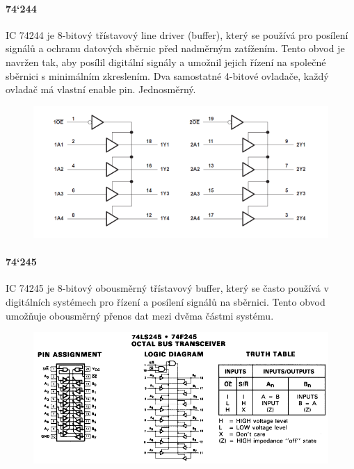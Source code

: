 \paragraph{74`244}
IC 74244 je 8-bitový třístavový line driver (buffer), který se používá pro posílení signálů a ochranu datových sběrnic před nadměrným zatížením. Tento obvod je navržen tak, aby posílil digitální signály a umožnil jejich řízení na společné sběrnici s minimálním zkreslením. Dva samostatné 4-bitové ovladače, každý ovladač má vlastní enable pin. Jednosměrný.
\begin{figure}[h]
\centering
\includegraphics[scale=0.8]{sections/3_pld_npld/images/74244.png}
\end{figure}
\paragraph{74`245}
IC 74245 je 8-bitový obousměrný třístavový buffer, který se často používá v digitálních systémech pro řízení a posílení signálů na sběrnici. Tento obvod umožňuje obousměrný přenos dat mezi dvěma částmi systému.
\begin{figure}[htbp]
\centering
\includegraphics[scale=0.4]{sections/3_pld_npld/images/74245.png}
\end{figure}
